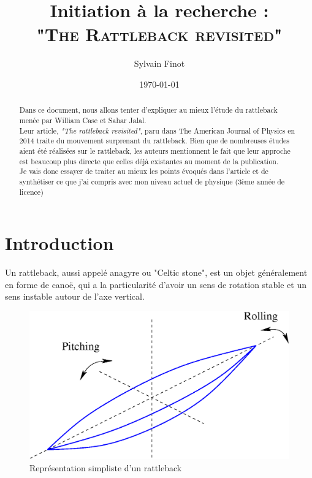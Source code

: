 \documentclass[12pt,a4paper]{article}
\author{Sylvain Finot}
\title{Initiation à la recherche :\\[5pt] \scshape "The Rattleback revisited"}
\date{\today}
\begin{document}
	\maketitle
	\thispagestyle{firststyle}
	\begin{abstract}
		Dans ce document, nous allons tenter d'expliquer au mieux l'étude du rattleback menée par William Case et Sahar Jalal.\\
		Leur article, \textit{"The rattleback revisited"}, paru dans The American Journal of Physics en 2014 traite du mouvement surprenant du rattleback. Bien que de nombreuses études aient été réalisées sur le rattleback, les auteurs mentionnent le fait que leur approche est beaucoup plus directe que celles déjà existantes au moment de la publication.\\
		
		Je vais donc essayer de traiter au mieux les points évoqués dans l'article et de synthétiser ce que j'ai compris avec mon niveau actuel de physique (3ème année de licence)
	\end{abstract}
	\section{Introduction}
	Un rattleback, aussi appelé anagyre ou "Celtic stone", est un objet généralement en forme de canoë, qui a la particularité d'avoir un sens de rotation stable et un sens instable autour de l'axe vertical.
	\begin{figure}[h]
		\centering
		\includegraphics[scale=0.2]{Rolling-pitching}
		\caption[]{Représentation simpliste d'un rattleback}
		\label{fig:rolling-pitching}
	\end{figure}
	
\end{document}
